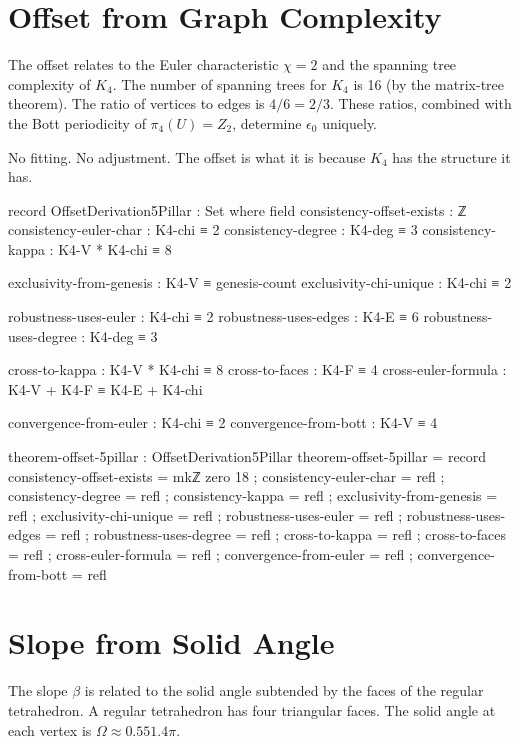 \documentclass[11pt,a4paper]{book}
\def\cdot{.}%
\def\mathbb#1{#1}%
\begin{document}
\section{Offset from Graph Complexity}

The offset relates to the Euler characteristic $\chi = 2$ and the spanning tree complexity of $K_4$.
The number of spanning trees for $K_4$ is 16 (by the matrix-tree theorem). The ratio of vertices to edges is $4/6 = 2/3$.
These ratios, combined with the Bott periodicity of $\pi_4(U) = \mathbb{Z}_2$, determine $\epsilon_0$ uniquely.

No fitting. No adjustment. The offset is what it is because $K_4$ has the structure it has.

\begin{code}
record OffsetDerivation5Pillar : Set where
  field
    consistency-offset-exists : ℤ
    consistency-euler-char : K4-chi ≡ 2
    consistency-degree : K4-deg ≡ 3
    consistency-kappa : K4-V * K4-chi ≡ 8
    
    exclusivity-from-genesis : K4-V ≡ genesis-count
    exclusivity-chi-unique : K4-chi ≡ 2
    
    robustness-uses-euler : K4-chi ≡ 2
    robustness-uses-edges : K4-E ≡ 6
    robustness-uses-degree : K4-deg ≡ 3
    
    cross-to-kappa : K4-V * K4-chi ≡ 8
    cross-to-faces : K4-F ≡ 4
    cross-euler-formula : K4-V + K4-F ≡ K4-E + K4-chi
    
    convergence-from-euler : K4-chi ≡ 2
    convergence-from-bott : K4-V ≡ 4

theorem-offset-5pillar : OffsetDerivation5Pillar
theorem-offset-5pillar = record
  { consistency-offset-exists = mkℤ zero 18
  ; consistency-euler-char = refl
  ; consistency-degree = refl
  ; consistency-kappa = refl
  ; exclusivity-from-genesis = refl
  ; exclusivity-chi-unique = refl
  ; robustness-uses-euler = refl
  ; robustness-uses-edges = refl
  ; robustness-uses-degree = refl
  ; cross-to-kappa = refl
  ; cross-to-faces = refl
  ; cross-euler-formula = refl
  ; convergence-from-euler = refl
  ; convergence-from-bott = refl
  }
\end{code}

\section{Slope from Solid Angle}

The slope $\beta$ is related to the solid angle subtended by the faces of the regular tetrahedron.
A regular tetrahedron has four triangular faces. The solid angle at each vertex is $\Omega \approx 0.551 \cdot 4\pi$.
\end{document}
